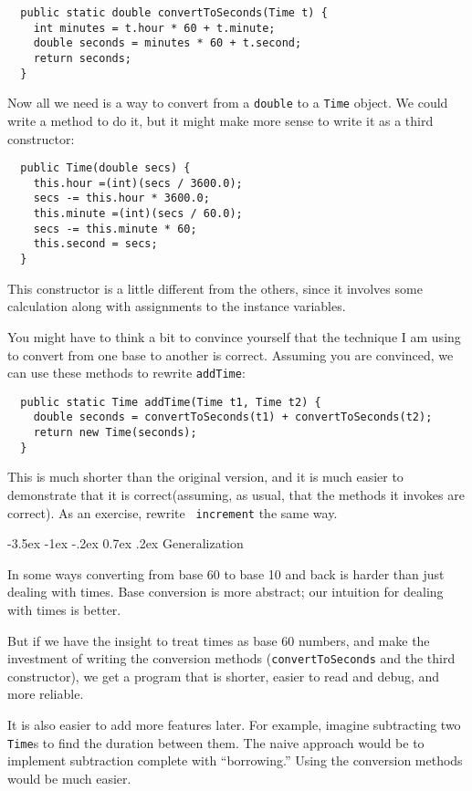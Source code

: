 \documentclass{book}
\makeatletter
\renewcommand{\section}{\@startsection 
    {section} {1} {0mm}%
    {-3.5ex \@plus -1ex \@minus -.2ex}%
    {0.7ex \@plus.2ex}%
    {\normalfont\Large\bfseries}}
\makeatother
\begin{document}
\begin{verbatim}
  public static double convertToSeconds(Time t) {
    int minutes = t.hour * 60 + t.minute;
    double seconds = minutes * 60 + t.second;
    return seconds;
  }
\end{verbatim}
%
Now all we need is a way to convert from a {\tt double}
to a {\tt Time} object.  We could write a method to
do it, but it might make more sense to write it as a third
constructor:

\begin{verbatim}
  public Time(double secs) {
    this.hour =(int)(secs / 3600.0);
    secs -= this.hour * 3600.0;
    this.minute =(int)(secs / 60.0);
    secs -= this.minute * 60;
    this.second = secs;
  }
\end{verbatim}
%
This constructor is a little different from the others, since
it involves some calculation along with assignments to the
instance variables.

You might have to think a bit to convince yourself that the technique
I am using to convert from one base to another is correct.  Assuming
you are convinced, we can use these methods to rewrite {\tt addTime}:

\begin{verbatim}
  public static Time addTime(Time t1, Time t2) {
    double seconds = convertToSeconds(t1) + convertToSeconds(t2);
    return new Time(seconds);
  }
\end{verbatim}
%
This is much shorter than the original version, and it is much easier
to demonstrate that it is correct(assuming, as usual, that the
methods it invokes are correct).  As an exercise, rewrite {\tt
increment} the same way.


\section{Generalization}

In some ways converting from base 60 to base 10 and back is
harder than just dealing with times.  Base conversion is more
abstract; our intuition for dealing with times is better.

But if we have the insight to treat times as base 60 numbers,
and make the investment of writing the conversion methods
({\tt convertToSeconds} and the third constructor), we get
a program that is shorter, easier to read and debug, and more
reliable.

It is also easier to add more features later.  For example, imagine
subtracting two {\tt Time}s to find the duration between them.  The
naive approach would be to implement subtraction complete with
``borrowing.''  Using the conversion methods would be much easier.
\end{document}
